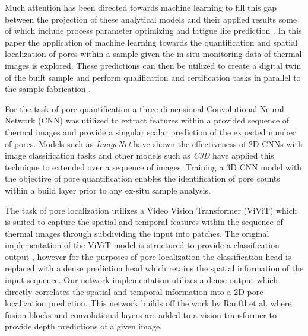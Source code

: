 Much attention has been directed towards machine learning to fill this gap
between the projection of these analytical models and their applied results some
of which include process parameter optimizing
\cite{baturynska_optimization_2018, ogoke_inexpensive_2023} and fatigue life
prediction \cite{zhan_machine_2021}. In this paper the application of machine
learning towards the quantification and spatial localization of pores within a
sample given the in-situ monitoring data of thermal images is explored. These
predictions can then be utilized to create a digital twin of the built sample
and perform qualification and certification tasks in parallel to the sample
fabrication \cite{gaikwad_toward_2020, bartsch_digital_2021,
knapp_building_2017}.

For the task of pore quantification a three dimensional Convolutional Neural
Network (CNN) was utilized to extract features within a provided sequence of
thermal images and provide a singular scalar prediction of the expected number
of pores.  Models such as \textit{ImageNet} \cite{krizhevsky_imagenet_2017} have
shown the effectiveness of 2D CNNs with image classification tasks and other
models such as \textit{C3D} \cite{tran_learning_2015} have applied this
technique to extended over a sequence of images. Training a 3D CNN model with
the objective of pore quantification enables the identification of pore counts
within a build layer prior to any ex-situ sample analysis.

The task of pore localization utilizes a Video Vision Transformer (ViViT)
\cite{arnab_vivit_2021} which is suited to capture the spatial and temporal
features within the sequence of thermal images through subdividing the input
into patches. The original implementation of the ViViT model is structured to
provide a classification output \cite{arnab_vivit_2021}, however for the
purposes of pore localization the classification head is replaced with a dense
prediction head which retains the spatial information of the input sequence. Our
network implementation utilizes a dense output which directly correlates the
spatial and temporal information into a 2D pore localization prediction. This
network builds off the work by Ranftl et al. \cite{ranftl_vision_2021} where
fusion blocks and convolutional layers are added to a vision transformer to
provide depth predictions of a given image.

